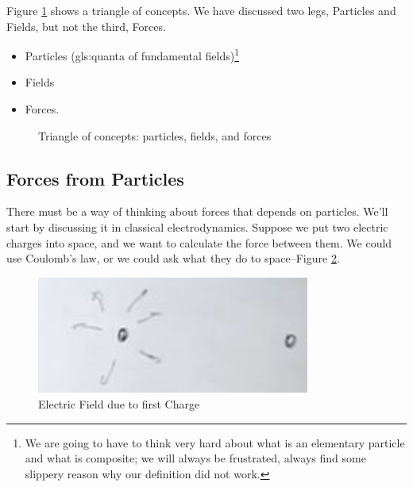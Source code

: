 \documentclass[]{article}
\begin{document}
Figure \ref{fig:particles:fields:forces} shows a triangle of concepts. We have discussed two legs, Particles and Fields, but not the third, Forces.
\begin{itemize}
	\item Particles (\gls{gls:quanta} of fundamental fields)\footnote{We are going to have to think very hard about what is an elementary particle and what is composite; we will always be frustrated, always find some slippery reason why our definition did not work.}
	\item Fields
	\item Forces. 
\end{itemize}



\begin{figure}[H]
	\begin{center}
		\caption{Triangle of concepts: particles, fields, and forces}\label{fig:particles:fields:forces}
	\end{center}
\end{figure}

\subsection{Forces from Particles}

There must be a way of thinking about forces that depends on particles. We'll start by discussing it in classical electrodynamics. Suppose we put two electric charges into space, and we want to calculate the force between them. We could use Coulomb's law, or we could ask what they do to space--Figure \ref{fig:electric-field-due-to-first-charge}.

\begin{figure}[H]
	\begin{center}
		\caption{Electric Field due to first Charge}\label{fig:electric-field-due-to-first-charge}
		\includegraphics[width=0.8\textwidth]{electric-field-due-to-first-charge}
	\end{center}
\end{figure}
\end{document}
